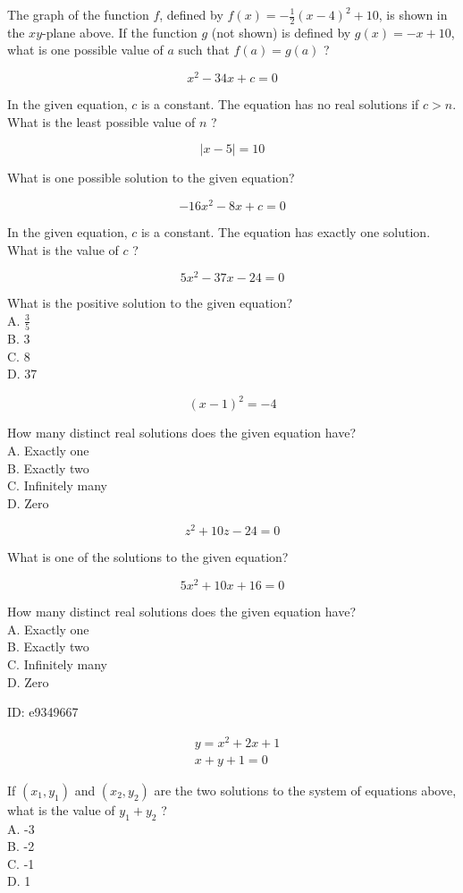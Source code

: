 The graph of the function $f$, defined by $f(x)=-\frac{1}{2}(x-4)^{2}+10$, is shown in the $x y$-plane above. If the function $g$ (not shown) is defined by $g(x)=-x+10$, what is one possible value of $a$ such that $f(a)=g(a)$ ?

$$
x^{2}-34 x+c=0
$$

In the given equation, $c$ is a constant. The equation has no real solutions if $c>n$. What is the least possible value of $n$ ?

$$
|x-5|=10
$$

What is one possible solution to the given equation?

$$
-16 x^{2}-8 x+c=0
$$

In the given equation, $c$ is a constant. The equation has exactly one solution. What is the value of $c$ ?

$$
5 x^{2}-37 x-24=0
$$

What is the positive solution to the given equation?\\
A. $\frac{3}{5}$\\
B. 3\\
C. 8\\
D. 37

$$
(x-1)^{2}=-4
$$

How many distinct real solutions does the given equation have?\\
A. Exactly one\\
B. Exactly two\\
C. Infinitely many\\
D. Zero

$$
z^{2}+10 z-24=0
$$

What is one of the solutions to the given equation?

$$
5 x^{2}+10 x+16=0
$$

How many distinct real solutions does the given equation have?\\
A. Exactly one\\
B. Exactly two\\
C. Infinitely many\\
D. Zero

ID: e9349667

$$
\begin{aligned}
& y=x^{2}+2 x+1 \\
& x+y+1=0
\end{aligned}
$$

If $\left(x_{1}, y_{1}\right)$ and $\left(x_{2}, y_{2}\right)$ are the two solutions to the system of equations above, what is the value of $y_{1}+y_{2}$ ?\\
A. -3\\
B. -2\\
C. -1\\
D. 1


